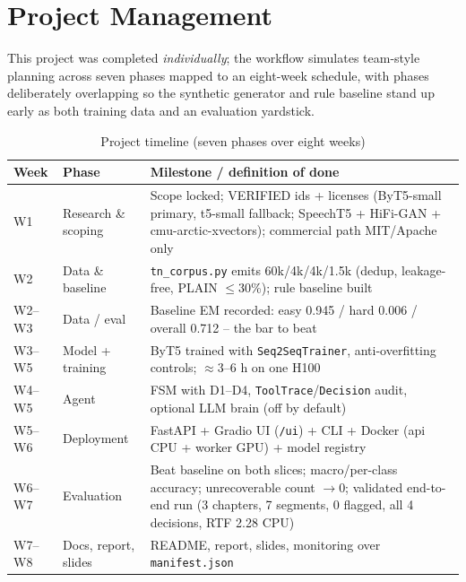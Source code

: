 \documentclass[12pt,a4paper]{article}
\begin{document}
\section{Project Management}

This project was completed \textit{individually}; the workflow simulates team-style planning across seven phases mapped to an eight-week schedule, with phases deliberately overlapping so the synthetic generator and rule baseline stand up early as both training data and an evaluation yardstick.

\begin{table}[H]
\centering
\caption{Project timeline (seven phases over eight weeks)}
\small
\begin{tabularx}{\linewidth}{@{} l l L @{}}
\toprule
\textbf{Week} & \textbf{Phase} & \textbf{Milestone / definition of done} \\
\midrule
W1 & Research \& scoping & Scope locked; VERIFIED ids + licenses (ByT5-small primary, t5-small fallback; SpeechT5 + HiFi-GAN + cmu-arctic-xvectors); commercial path MIT/Apache only \\
W2 & Data \& baseline & \texttt{tn\_corpus.py} emits 60k/4k/4k/1.5k (dedup, leakage-free, PLAIN $\le$30\%); rule baseline built \\
W2--W3 & Data / eval & Baseline EM recorded: easy 0.945 / hard 0.006 / overall 0.712 -- the bar to beat \\
W3--W5 & Model + training & ByT5 trained with \texttt{Seq2SeqTrainer}, anti-overfitting controls; $\approx$3--6 h on one H100 \\
W4--W5 & Agent & FSM with D1--D4, \texttt{ToolTrace}/\texttt{Decision} audit, optional LLM brain (off by default) \\
W5--W6 & Deployment & FastAPI + Gradio UI (\texttt{/ui}) + CLI + Docker (api CPU + worker GPU) + model registry \\
W6--W7 & Evaluation & Beat baseline on both slices; macro/per-class accuracy; unrecoverable count $\rightarrow$0; validated end-to-end run (3 chapters, 7 segments, 0 flagged, all 4 decisions, RTF 2.28 CPU) \\
W7--W8 & Docs, report, slides & README, report, slides, monitoring over \texttt{manifest.json} \\
\bottomrule
\end{tabularx}
\end{table}
\end{document}

